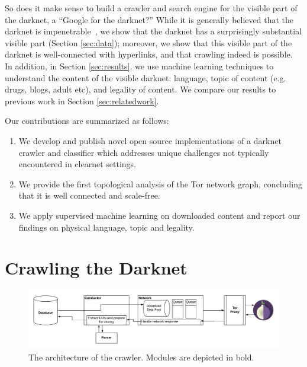 % 
So does it make sense to build a crawler and search engine for the visible part of the darknet, a ``Google for the darknet?'' While it is generally believed that the darknet is impenetrable~\cite{Biryukov2014,Nabki2017}, we show that the darknet has a surprisingly substantial visible part (Section \ref{sec:data}); moreover, we show that this visible part of the darknet is well-connected with hyperlinks, and that crawling indeed is possible. In addition, in Section \ref{sec:results}, we use machine learning techniques to understand the content of the visible darknet: language, topic of content (e.g. drugs, blogs, adult etc), and legality of content.  
We compare our results to previous work in Section \ref{sec:relatedwork}.

Our contributions are summarized as follows:

\begin{enumerate}
    \item We develop and publish novel open source implementations of a darknet crawler and classifier which addresses unique challenges not typically encountered in clearnet settings.
    \item We provide the first topological analysis of the Tor network graph, concluding that it is well connected and scale-free.
    \item We apply supervised machine learning on downloaded content and report our findings on physical language, topic and legality.
\end{enumerate}

\section{Crawling the Darknet}

\ifdgruyter
\begin{figure}[H]
\includegraphics[width=\linewidth]{images/ArchitecturalSchema.png}
\caption{The architecture of the crawler. Modules are depicted in bold.~\cite{Loconte}}
\label{fig:scraperArchitecture}
\end{figure}
\fi

